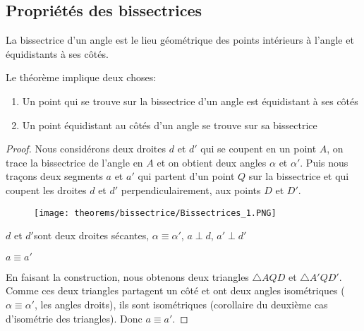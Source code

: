 \documentclass[a4paper,12pt]{article}
\begin{document}
\pagebreak
\subsection{Propriétés des bissectrices}
\begin{theorem}
La bissectrice d'un angle est le lieu géométrique des points intérieurs à l'angle et équidistants à ses côtés.
\end{theorem}
Le théorème implique deux choses:
\begin{enumerate}
\item Un point qui se trouve sur la bissectrice d'un angle est équidistant à ses côtés
\item Un point équidistant au côtés d'un angle se trouve sur sa bissectrice
\end{enumerate}
\begin{proof}
Nous considérons deux droites $d$ et $d'$ qui se coupent en un point $A$, on trace la bissectrice de l'angle en $A$ et on obtient deux angles $\alpha$ et $\alpha'$. Puis nous traçons deux segments $a$ et $a'$ qui partent d'un point $Q$ sur la bissectrice et qui coupent les droites $d$ et $d'$ perpendiculairement, aux points $D$ et $D'$.
\begin{figure}[H]
    \centering
    \texttt{[image: theorems/bissectrice/Bissectrices\_1.PNG]}
\end{figure}


\begin{hyp}
$d$ et $d'$sont deux droites sécantes, $\alpha \equiv \alpha'$, $a\perp d$, $a' \perp d'$
\end{hyp}
\begin{concl}
$a\equiv a'$
\end{concl}
En faisant la construction, nous obtenons deux triangles $\triangle AQD$ et $\triangle A'QD'$. Comme ces deux triangles partagent un côté et ont deux angles isométriques ($\alpha \equiv \alpha'$, les angles droits), ils sont isométriques (corollaire du deuxième cas d'isométrie des triangles). Donc $a \equiv a'$.
\end{proof}
\end{document}
